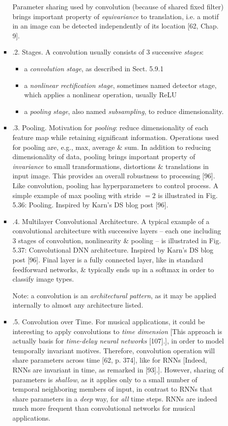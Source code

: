 \documentclass{article}
\begin{document}
\begin{itemize}
\begin{itemize}
\begin{itemize}
			Parameter sharing used by convolution (because of shared fixed filter) brings important property of {\it equivariance} to translation, i.e. a motif in an image can be detected independently of its location [62, Chap. 9].
			\item {.2. Stages.} A convolution usually consists of 3 successive {\it stages}:
			\begin{itemize}
				\item a {\it convolution stage}, as described in Sect. 5.9.1
				\item a {\it nonlinear rectification stage}, sometimes named detector stage, which applies a nonlinear operation, usually ReLU
				\item a {\it pooling stage}, also named {\it subsampling}, to reduce dimensionality.
			\end{itemize}
			\item {.3. Pooling.} Motivation for {\it pooling}: reduce dimensionality of each feature map while retaining significant information. Operations used for pooling are, e.g., max, average \& sum. In addition to reducing dimensionality of data, pooling brings important property of {\it invariance} to small transformations, distortions \& translations in input image. This provides an overall robustness to processing [96]. Like convolution, pooling has hyperparameters to control process. A simple example of max pooling with stride $= 2$ is illustrated in {\sf Fig. 5.36: Pooling. Inspired by {\sc Karn}'s DS blog post [96]}.
			\item {.4. Multilayer Convolutional Architecture.} A typical example of a convolutional architecture with successive layers -- each one including 3 stages of convolution, nonlinearity \& pooling -- is illustrated in {\sf Fig. 5.37: Convolutional DNN architecture. Inspired by {\sc Karn}'s DS blog post [96]}. Final layer is a fully connected layer, like in standard feedforward networks, \& typically ends up in a softmax in order to classify image types.

			Note: a convolution is an {\it architectural pattern}, as it may be applied internally to almost any architecture listed.
			\item {.5. Convolution over Time.} For musical applications, it could be interesting to apply convolutions to {\it time dimension} [This approach is actually basis for {\it time-delay neural networks} [107].], in order to model temporally invariant motives. Therefore, convolution operation will share parameters across time [62, p. 374], like for RNNs [Indeed, RNNs are invariant in time, as remarked in [93].]. However, sharing of parameters is {\it shallow}, as it applies only to a small number of temporal neighboring members of input, in contrast to RNNs that share parameters in a {\it deep} way, for {\it all} time steps. RNNs are indeed much more frequent than convolutional networks for musical applications.


\end{itemize}
\end{itemize}
\end{itemize}
\end{document}

